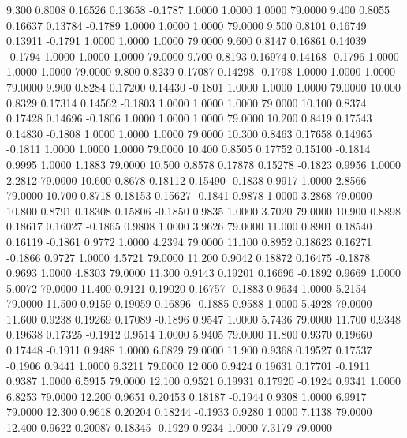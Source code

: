    9.300   0.8008   0.16526   0.13658  -0.1787   1.0000   1.0000   1.0000  79.0000
   9.400   0.8055   0.16637   0.13784  -0.1789   1.0000   1.0000   1.0000  79.0000
   9.500   0.8101   0.16749   0.13911  -0.1791   1.0000   1.0000   1.0000  79.0000
   9.600   0.8147   0.16861   0.14039  -0.1794   1.0000   1.0000   1.0000  79.0000
   9.700   0.8193   0.16974   0.14168  -0.1796   1.0000   1.0000   1.0000  79.0000
   9.800   0.8239   0.17087   0.14298  -0.1798   1.0000   1.0000   1.0000  79.0000
   9.900   0.8284   0.17200   0.14430  -0.1801   1.0000   1.0000   1.0000  79.0000
  10.000   0.8329   0.17314   0.14562  -0.1803   1.0000   1.0000   1.0000  79.0000
  10.100   0.8374   0.17428   0.14696  -0.1806   1.0000   1.0000   1.0000  79.0000
  10.200   0.8419   0.17543   0.14830  -0.1808   1.0000   1.0000   1.0000  79.0000
  10.300   0.8463   0.17658   0.14965  -0.1811   1.0000   1.0000   1.0000  79.0000
  10.400   0.8505   0.17752   0.15100  -0.1814   0.9995   1.0000   1.1883  79.0000
  10.500   0.8578   0.17878   0.15278  -0.1823   0.9956   1.0000   2.2812  79.0000
  10.600   0.8678   0.18112   0.15490  -0.1838   0.9917   1.0000   2.8566  79.0000
  10.700   0.8718   0.18153   0.15627  -0.1841   0.9878   1.0000   3.2868  79.0000
  10.800   0.8791   0.18308   0.15806  -0.1850   0.9835   1.0000   3.7020  79.0000
  10.900   0.8898   0.18617   0.16027  -0.1865   0.9808   1.0000   3.9626  79.0000
  11.000   0.8901   0.18540   0.16119  -0.1861   0.9772   1.0000   4.2394  79.0000
  11.100   0.8952   0.18623   0.16271  -0.1866   0.9727   1.0000   4.5721  79.0000
  11.200   0.9042   0.18872   0.16475  -0.1878   0.9693   1.0000   4.8303  79.0000
  11.300   0.9143   0.19201   0.16696  -0.1892   0.9669   1.0000   5.0072  79.0000
  11.400   0.9121   0.19020   0.16757  -0.1883   0.9634   1.0000   5.2154  79.0000
  11.500   0.9159   0.19059   0.16896  -0.1885   0.9588   1.0000   5.4928  79.0000
  11.600   0.9238   0.19269   0.17089  -0.1896   0.9547   1.0000   5.7436  79.0000
  11.700   0.9348   0.19638   0.17325  -0.1912   0.9514   1.0000   5.9405  79.0000
  11.800   0.9370   0.19660   0.17448  -0.1911   0.9488   1.0000   6.0829  79.0000
  11.900   0.9368   0.19527   0.17537  -0.1906   0.9441   1.0000   6.3211  79.0000
  12.000   0.9424   0.19631   0.17701  -0.1911   0.9387   1.0000   6.5915  79.0000
  12.100   0.9521   0.19931   0.17920  -0.1924   0.9341   1.0000   6.8253  79.0000
  12.200   0.9651   0.20453   0.18187  -0.1944   0.9308   1.0000   6.9917  79.0000
  12.300   0.9618   0.20204   0.18244  -0.1933   0.9280   1.0000   7.1138  79.0000
  12.400   0.9622   0.20087   0.18345  -0.1929   0.9234   1.0000   7.3179  79.0000
